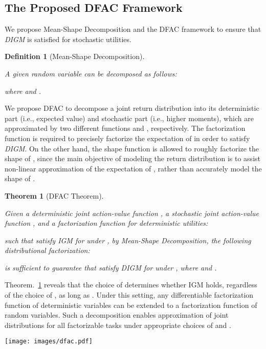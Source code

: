 \documentclass{article}
\newcommand{\digm}{\textit{DIGM}}
\newcounter{definition}
\newtheorem{theorem}{Theorem}[section]
\newtheorem{definition}[definition]{Definition}
\begin{document}
\subsection{The Proposed DFAC Framework}
\label{subsec:methodology_the_proposed_dfac_framework}

We propose Mean-Shape Decomposition and the DFAC framework to ensure that \digm{} is satisfied for stochastic utilities.

\begin{definition}[Mean-Shape Decomposition]
\label{def:mean_shape_decomposition}

A given random variable  can be decomposed as follows:

where  and .

\end{definition} 
We propose DFAC to decompose a joint return distribution  into its deterministic part  (i.e., expected value) and stochastic part  (i.e., higher moments), which are approximated by two different functions  and , respectively. The factorization function  is required to precisely factorize the expectation of  in order to satisfy \digm{}. On the other hand, the shape function  is allowed to roughly factorize the shape of , since the main objective of modeling the return distribution is to assist non-linear approximation of the expectation of  \cite{Lyle2019Comparative}, rather than accurately model the shape of .

\begin{theorem}[DFAC Theorem]
\label{thm:dfac}

Given a deterministic joint action-value function , a stochastic joint action-value function , and a factorization function  for deterministic utilities:

such that  satisfy IGM for  under , by Mean-Shape Decomposition, the following distributional factorization:

is sufficient to guarantee that  satisfy \digm{} for  under , where  and  .
\end{theorem} 
Theorem.~\ref{thm:dfac} reveals that the choice of  determines whether IGM holds, regardless of the choice of , as long as . Under this setting, any differentiable factorization function of deterministic variables can be extended to a factorization function of random variables. Such a decomposition enables approximation of joint distributions for all factorizable tasks under appropriate choices of   and .



\begin{figure*}[t]
\texttt{[image: images/dfac.pdf]}
\caption{The DFAC framework consists of a factorization network  and a shape network  for decomposing the deterministic part  (i.e., ) and the stochastic part  of the total return distribution , as described in Theorem~\ref{thm:dfac}. The shape network contains parameter networks  and  for generating   and .}
\label{fig:dfac}
\end{figure*}
 
\end{document}
